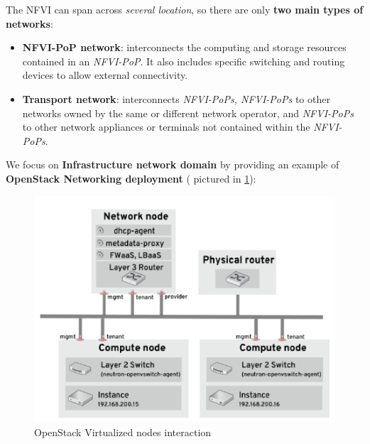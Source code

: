 \documentclass[10pt,a4paper]{report}
\theoremstyle{definition}
\begin{document}
The NFVI can span across \textit{several location}, so there are only \textbf{two main types of networks}:
\begin{itemize}
	\item 
	\textbf{NFVI-PoP network}: interconnects the computing and storage resources contained in an \textit{NFVI-PoP}. It also includes specific switching and routing devices to allow external connectivity.
	\item 
	\textbf{Transport network}: interconnects \textit{NFVI-PoPs, NFVI-PoPs} to other networks owned by the same or different network operator, and \textit{NFVI-PoPs} to other network appliances or terminals not contained within the \textit{NFVI-PoPs}.
\end{itemize}
We focus on \textbf{Infrastructure network domain} by providing an example of \textbf{OpenStack Networking deployment} ( pictured in \ref{openstack-eg1}):
\begin{figure}[h]
	\centering\includegraphics[scale=0.50]{images/Pasted image 20230405172420.png}
	\caption{OpenStack Virtualized nodes interaction}
	\label{openstack-eg1}
\end{figure}
\end{document}
